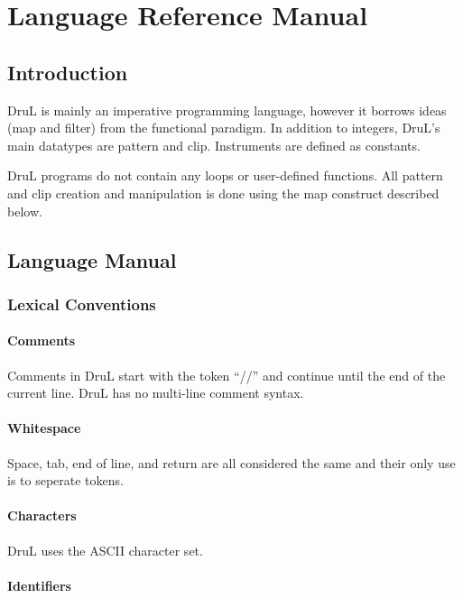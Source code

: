 \chapter{Language Reference Manual}
\section{Introduction}

DruL is mainly an imperative programming language, however it borrows ideas (map and filter) from the functional paradigm.  In addition to integers, DruL's main datatypes are pattern and clip. Instruments are defined as constants.

DruL programs do not contain any loops or user-defined functions.  All pattern 
and clip creation and manipulation is done using the map construct described below.

\section{Language Manual}

\subsection{Lexical Conventions}

\subsubsection{Comments}

Comments in DruL start with the token ``//'' and continue until the end of the current line.
DruL has no multi-line comment syntax.

\subsubsection{Whitespace}

Space, tab, end of line, and return are all considered the same 
and their only use is to seperate tokens.

\subsubsection{Characters}

DruL uses the ASCII character set.

\subsubsection{Identifiers}

